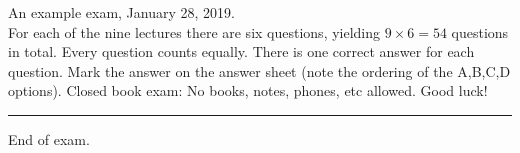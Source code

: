 \documentclass[10pt]{article}
\begin{document}
An example exam, January 28, 2019. \\

For each of the nine lectures there are six questions, yielding $9 \times 6 =54$ questions in total. Every question counts equally. There is one correct answer for each question. Mark the answer on the answer sheet (note the ordering of the A,B,C,D options). Closed book exam: No books, notes, phones, etc allowed. Good luck! 

\noindent\rule{\textwidth}{1pt} 



End of exam.
\end{document}
